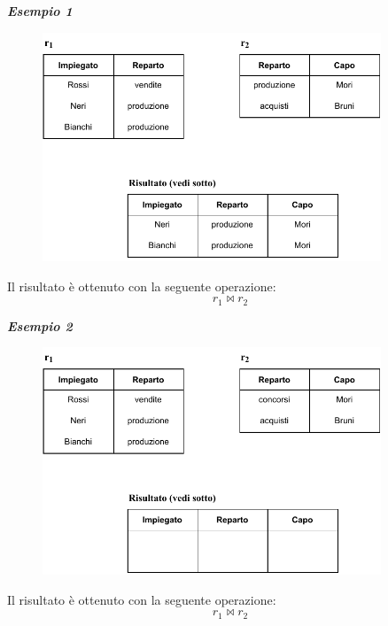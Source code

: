 \documentclass[a4paper]{article}
\begin{document}
	\noindent
	\textcolor{Green4}{\textbf{\emph{Esempio 1}}}
	
	\begin{figure}[!htp]
		\centering
		\includegraphics[width=0.9\textwidth]{img/join_dangling.pdf}
	\end{figure}
	
	\noindent
	Il risultato è ottenuto con la seguente operazione:
	\begin{equation*}
		r_{1} \Join r_{2}
	\end{equation*}
	
	\noindent
	\textcolor{Green4}{\textbf{\emph{Esempio 2}}}
	
	\begin{figure}[!htp]
		\centering
		\includegraphics[width=0.9\textwidth]{img/join_vuoto.pdf}
	\end{figure}
	
	\noindent
	Il risultato è ottenuto con la seguente operazione:
	\begin{equation*}
		r_{1} \Join r_{2}
	\end{equation*}
\end{document}
